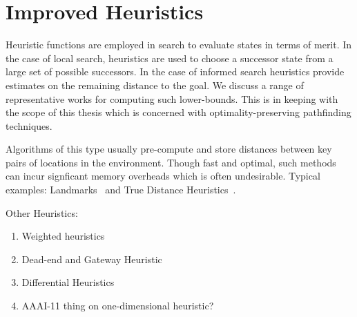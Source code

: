 \section{Improved Heuristics}
\label{cha::lit::heuristics}
Heuristic functions are employed in search to evaluate states in terms
of merit. In the case of local search, heuristics are used to choose 
a successor state from a large set of possible successors. In the case
of informed search heuristics provide estimates on the remaining distance 
to the goal. We discuss a range of representative works for computing such 
lower-bounds. This is in keeping with the scope of this thesis which is
concerned with optimality-preserving pathfinding techniques.

Algorithms of this type usually pre-compute and store distances between key pairs of locations
in the environment. Though fast and optimal, such methods can incur signficant
memory overheads which is often undesirable. Typical examples: Landmarks~\cite{goldberg05} and
True Distance Heuristics~\cite{sturtevant09}.

Other Heuristics:
\begin{enumerate}
\item{Weighted heuristics}
\item{Dead-end and Gateway Heuristic}
\item{Differential Heuristics}
\item{AAAI-11 thing on one-dimensional heuristic?}
\end{enumerate}

